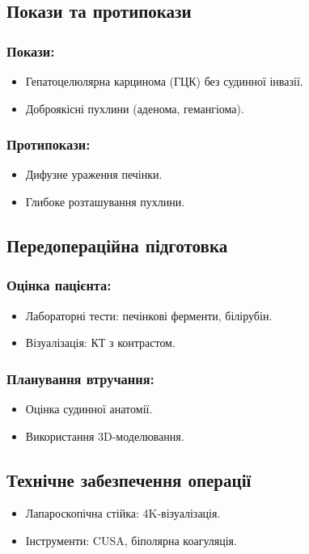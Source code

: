 \begin{refsection}
\subsection{Покази та протипокази}
\subsubsection{Покази:}
\begin{itemize}
    \item Гепатоцелюлярна карцинома (ГЦК) без судинної інвазії.
    \item Доброякісні пухлини (аденома, гемангіома).
\end{itemize}

\subsubsection{Протипокази:}
\begin{itemize}
    \item Дифузне ураження печінки.
    \item Глибоке розташування пухлини.
\end{itemize}

\subsection{Передопераційна підготовка}
\subsubsection{Оцінка пацієнта:}
\begin{itemize}
    \item Лабораторні тести: печінкові ферменти, білірубін.
    \item Візуалізація: КТ з контрастом.
\end{itemize}

\subsubsection{Планування втручання:}
\begin{itemize}
    \item Оцінка судинної анатомії.
    \item Використання 3D-моделювання.
\end{itemize}

\subsection{Технічне забезпечення операції}
\begin{itemize}
    \item Лапароскопічна стійка: 4K-візуалізація.
    \item Інструменти: CUSA, біполярна коагуляція.
\end{itemize}


\end{refsection}
